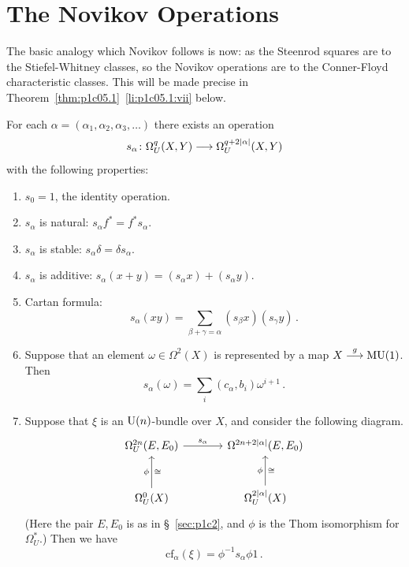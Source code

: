\documentclass[../main]{subfiles}
\begin{document}
\chapter{The Novikov Operations}
\label{sec:p1c5}
The basic analogy which Novikov follows is now: as the Steenrod squares are to the Stiefel-Whitney classes, so the Novikov operations are to the Conner-Floyd characteristic classes.
This will be made precise in Theorem~\ref*{thm:p1c05.1}~\ref{li:p1c05.1:vii} below.

\begin{theorem}[S.P. Novikov]
\label{thm:p1c05.1}
For each $\alpha = (\alpha_1, \alpha_2, \alpha_3, \ldots)$ there exists an operation 
\begin{equation*}
	s_\alpha\colon \Omega_U^q(X, Y) \longrightarrow \Omega_U^{q + 2\lvert\alpha\rvert} (X, Y)
\end{equation*}
with the following properties:
\begin{enumerate}[label=(\roman*)]
	\item \label{li:p1c05.1:i}$s_0 = 1$, the identity operation.
	\item \label{li:p1c05.1:ii} $s_\alpha$ is natural: $s_\alpha f^\ast = f^\ast s_\alpha$.
	\item \label{li:p1c05.1:iii} $s_\alpha$ is stable: $s_\alpha \delta = \delta s_\alpha$.
	\item \label{li:p1c05.1:iv}$s_\alpha$ is additive: $s_\alpha (x + y) = (s_\alpha x) + (s_\alpha y)$.
	\item \label{li:p1c05.1:v} Cartan formula:
		\begin{equation*}
			s_\alpha(xy) = \sum_{\beta + \gamma = \alpha} (s_\beta x) (s_\gamma y)\,.
		\end{equation*}
	\item \label{li:p1c05.1:vi} Suppose that an element $\omega \in \Omega^2(X)$ is represented by a map $X \stackrel{g}{\longrightarrow} \mathrm{MU}(1)$. 
	Then 
		\begin{equation*}
			s_\alpha(\omega) = \sum_i (c_\alpha, b_i) \omega^{i + 1}\,.
		\end{equation*}
	\item \label{li:p1c05.1:vii} Suppose that $\xi$ is an $\mathrm{U}(n)$-bundle over $X$, and consider the following diagram.
	\begin{equation*}
		\begin{tikzcd}[row sep=large, column sep=large]
			\Omega_U^{2n}(E, E_0) \arrow[r, "s_\alpha"]	& {\Omega^{2n + 2\abs{\alpha}}(E, E_0)}\\ 
			\Omega_U^0(X) \arrow[u, "\phi", "\cong"']	& \Omega_U^{2\abs{\alpha}}(X) \arrow[u, "\phi", "\cong"']
		\end{tikzcd}
	\end{equation*}
	(Here the pair $E, E_0$ is as in \S~\ref{sec:p1c2}, and $\phi$ is the Thom isomorphism for $\Omega_U^\ast$.) 
	Then we have 
		\begin{equation*}
			\mathrm{cf}_\alpha(\xi) = \phi^{-1} s_\alpha \phi 1\,.
		\end{equation*}
\end{enumerate}
\end{theorem}
\end{document}
